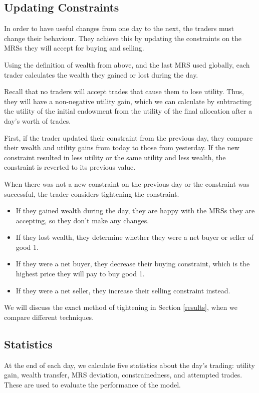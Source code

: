 \documentclass[12pt,a4paper,titlepage]{article}
\begin{document}
\subsection{Updating Constraints}
In order to have useful changes from one day to the next, the traders must change their behaviour.
They achieve this by updating the constraints on the MRSs they will accept for buying and selling.

Using the definition of wealth from above, and the last MRS used globally, each trader calculates the wealth they gained or lost during the day.

Recall that no traders will accept trades that cause them to lose utility. 
Thus, they will have a non-negative utility gain, which we can calculate by subtracting the utility of the initial endowment from the utility of the final allocation after a day's worth of trades.

First, if the trader updated their constraint from the previous day, they compare their wealth and utility gains from today to those from yesterday.
If the new constraint resulted in less utility or the same utility and less wealth, the constraint is reverted to its previous value.

When there was not a new constraint on the previous day or the constraint was successful, the trader considers tightening the constraint.
\begin{itemize}
  \item If they gained wealth during the day, they are happy with the MRSs they are accepting, so they don't make any changes.
  \item If they lost wealth, they determine whether they were a net buyer or seller of good 1.
  \item If they were a net buyer, they decrease their buying constraint, which is the highest price they will pay to buy good 1.
  \item If they were a net seller, they increase their selling constraint instead.
\end{itemize}
We will discuss the exact method of tightening in Section \ref{results}, when we compare different techniques.

\subsection{Statistics}
At the end of each day, we calculate five statistics about the day's trading: utility gain, wealth transfer, MRS deviation, constrainedness, and attempted trades.
These are used to evaluate the performance of the model.
\end{document}
